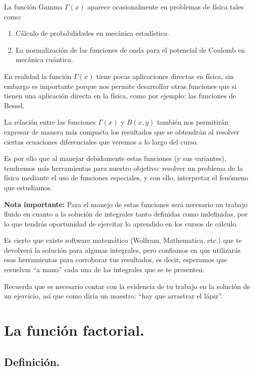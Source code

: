 La función Gamma $\Gamma (x)$ aparece ocasionalmente en problemas de física tales como:
\begin{enumerate}
\item Cálculo de probabilidades en mecánica estadística.
\item La normalización de las funciones de onda para el potencial de Coulomb en mecánica cuántica.
\end{enumerate}
En realidad la función $\Gamma (x)$ tiene pocas aplicaciones directas en física, sin embargo es importante porque nos permite desarrollar otras funciones que si tienen una aplicación directa en la física, como por ejemplo: las funciones de Bessel.
\par
La relación entre las funciones $\Gamma (x)$ y $B (x, y)$ también nos permitirán expresar de manera más compacta los resultados que se obtendrán al resolver ciertas ecuaciones diferenciales que veremos a lo largo del curso.
\par
Es por ello que al manejar debidamente estas funciones (y sus variantes), tendremos más herramientas para nuestro objetivo: resolver un problema de la física mediante el uso de funciones especiales, y con ello, interpretar el fenómeno que estudiamos.
\par
\textbf{Nota importante: }Para el manejo de estas funciones será necesario un trabajo fluido en cuanto a la solución de integrales tanto definidas como indefinidas, por lo que tendrás oportunidad de ejercitar lo aprendido en los cursos de cálculo.
\par
Es cierto que existe software matemático (Wolfram, Mathematica, etc.) que te devolverá la solución para algunas integrales, pero confiamos en que utilizarás esas herramientas para corroborar tus resultados, es decir, esperamos que resuelvas \enquote{a mano} cada una de las integrales que se te presenten.
\par
Recuerda que es necesario contar con la evidencia de tu trabajo en la solución de un ejercicio, así que como diría un maestro: \enquote{hay que arrastrar el lápiz}.

\section{La función factorial.}

\subsection{Definición.}

